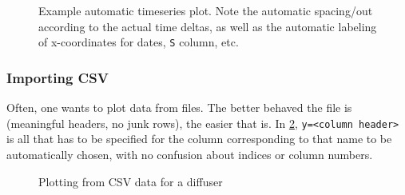 \begin{figure}[tbp]

    \centering
    \caption[Example automatic timeseries plot]{%
        Example automatic timeseries plot.
        Note the automatic spacing\-/out according to the actual time deltas,
        as well as the automatic labeling of x-coordinates for dates,
        \texttt{S} column, etc.
    }
    \label{fig:example_timeseries_plot}
\end{figure}

\subsubsection{Importing CSV}

Often, one wants to plot data from files.
The better behaved the file is (meaningful headers, no junk rows), the easier that is.
In \cref{fig:diffuser}, \verb|y=<column header>| is all that has to be specified for the
column corresponding to that name to be automatically chosen, with no confusion
about indices or column numbers.
\begin{figure}[tbp]

    \centering
    \caption{Plotting from CSV data for a diffuser}
    \label{fig:diffuser}
\end{figure}

